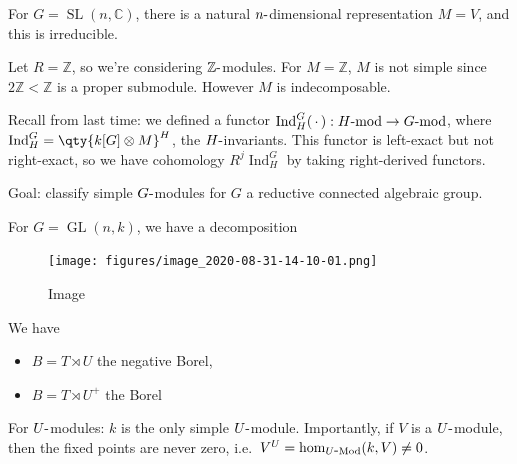 \begin{example}

For \(G = {\operatorname{SL}}(n, {\mathbb{C}})\), there is a natural
\(n{\hbox{-}}\)dimensional representation \(M = V\), and this is
irreducible.

\end{example}


\begin{example}

Let \(R = {\mathbb{Z}}\), so we're considering
\({\mathbb{Z}}{\hbox{-}}\)modules. For \(M={\mathbb{Z}}\), \(M\) is not
simple since \(2{\mathbb{Z}}< {\mathbb{Z}}\) is a proper submodule.
However \(M\) is indecomposable.

\end{example}

Recall from last time: we defined a functor
\(\operatorname{Ind}_H^G({\,\cdot\,}): H{\hbox{-}}\text{mod} \to G{\hbox{-}}\text{mod}\),
where \(\operatorname{Ind}_H^G = \qty{k[G] \otimes M}^H\), the
\(H{\hbox{-}}\)invariants. This functor is left-exact but not
right-exact, so we have cohomology \(R^j \operatorname{Ind}_H^G\) by
taking right-derived functors.

Goal: classify simple \(G{\hbox{-}}\)modules for \(G\) a reductive
connected algebraic group.

\begin{example}

For \(G = \operatorname{GL}(n , k)\), we have a decomposition

\begin{figure}
\centering
\texttt{[image: figures/image\_2020-08-31-14-10-01.png]}
\caption{Image}
\end{figure}

\end{example}

We have

\begin{itemize}
\tightlist
\item
  \(B = T\rtimes U\) the negative Borel,
\item
  \(B = T\rtimes U^+\) the Borel
\end{itemize}

For \(U{\hbox{-}}\)modules: \(k\) is the only simple
\(U{\hbox{-}}\)module. Importantly, if \(V\) is a \(U{\hbox{-}}\)module,
then the fixed points are never zero,
i.e.~\(V^U = \hom_{U{\hbox{-}}\text{Mod}}(k, V) \neq 0\).

